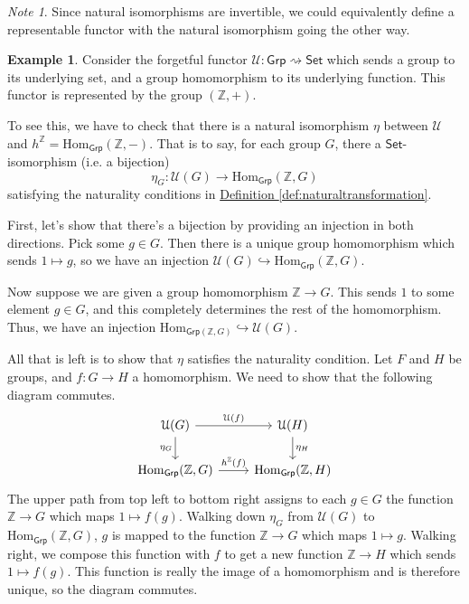 \documentclass[a4paper,10pt]{scrreprt}
\newcommand{\Z}{\mathbb{Z}}
\newcommand{\Hom}{\mathrm{Hom}}
\theoremstyle{definition}
\newtheorem{example}{Example}[section]
\theoremstyle{plain}
\theoremstyle{remark}
\newtheorem{note}{Note}[section]
\begin{document}
\begin{note}
  Since natural isomorphisms are invertible, we could equivalently define a representable functor with the natural isomorphism going the other way.
\end{note}

\begin{example}
  Consider the forgetful functor $\mathcal{U}\colon \mathsf{Grp} \rightsquigarrow \mathsf{Set}$ which sends a group to its underlying set, and a group homomorphism to its underlying function. This functor is represented by the group $(\Z, +)$.

  To see this, we have to check that there is a natural isomorphism $\eta$ between $\mathcal{U}$ and $h^{\Z} = \Hom_{\mathsf{Grp}}(\Z, -)$. That is to say, for each group $G$, there a $\mathsf{Set}$-isomorphism (i.e. a bijection)
  \begin{equation*}
    \eta_{G}\colon \mathcal{U}(G) \to \Hom_{\mathsf{Grp}}(\Z, G)
  \end{equation*}
  satisfying the naturality conditions in \hyperref[def:naturaltransformation]{Definition \ref*{def:naturaltransformation}}.

  First, let's show that there's a bijection by providing an injection in both directions. Pick some $g \in G$. Then there is a unique group homomorphism which sends $1 \mapsto g$, so we have an injection $\mathcal{U}(G) \hookrightarrow \Hom_{\mathsf{Grp}}(\Z, G)$.

  Now suppose we are given a group homomorphism $\Z \to G$. This sends $1$ to some element $g \in G$, and this completely determines the rest of the homomorphism. Thus, we have an injection $\Hom_{\mathsf{Grp}(\Z, G)} \hookrightarrow \mathcal{U}(G)$.

  All that is left is to show that $\eta$ satisfies the naturality condition. Let $F$ and $H$ be groups, and $f\colon G \to H$ a homomorphism. We need to show that the following diagram commutes.
  \begin{equation*}
    \begin{tikzcd}
      \mathcal{U}(G)
      \arrow[r, "\mathcal{U}(f)"]
      \arrow[d, swap, "\eta_{G}"]
      & \mathcal{U}(H)
      \arrow[d, "\eta_{H}"]
      \\
      \Hom_{\mathsf{Grp}}(\Z, G)
      \arrow[r, "h^{\Z}(f)"]
      & \Hom_{\mathsf{Grp}}(\Z, H)
    \end{tikzcd}
  \end{equation*}
  The upper path from top left to bottom right assigns to each $g \in G$ the function $\Z \to G$ which maps $1 \mapsto f(g)$. Walking down $\eta_{G}$ from $\mathcal{U}(G)$ to $\Hom_{\mathsf{Grp}}(\Z, G)$, $g$ is mapped to the function $\Z \to G$ which maps $1 \mapsto g$. Walking right, we compose this function with $f$ to get a new function $\Z \to H$ which sends $1 \mapsto f(g)$. This function is really the image of a homomorphism and is therefore unique, so the diagram commutes.
\end{example}
\end{document}
